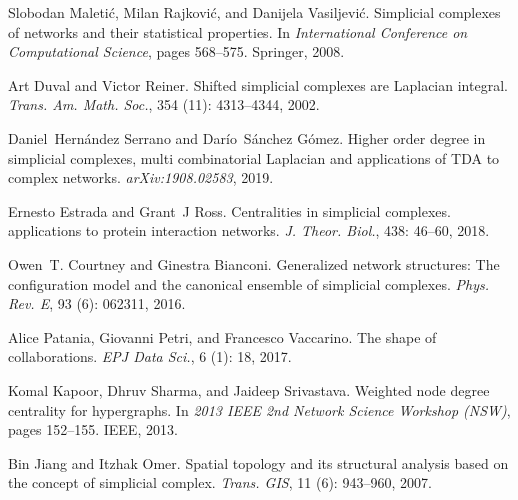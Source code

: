 Slobodan Maleti{\'c}, Milan Rajkovi{\'c}, and Danijela Vasiljevi{\'c}.
\newblock Simplicial complexes of networks and their statistical properties.
\newblock In \emph{International Conference on Computational Science}, pages
568--575. {Springer}, 2008.

Art Duval and Victor Reiner.
\newblock Shifted simplicial complexes are {{Laplacian}} integral.
\newblock \emph{Trans. Am. Math. Soc.}, 354 (11): 4313--4344,
2002.

Daniel~Hern{\'a}ndez Serrano and Dar{\'i}o~S{\'a}nchez G{\'o}mez.
\newblock Higher order degree in simplicial complexes, multi combinatorial
{{Laplacian}} and applications of {{TDA}} to complex networks.
\newblock \emph{arXiv:1908.02583}, 2019{}.

Ernesto Estrada and Grant~J Ross.
\newblock Centralities in simplicial complexes. applications to protein
interaction networks.
\newblock \emph{J. Theor. Biol.}, 438: 46--60, 2018.

Owen~T. Courtney and Ginestra Bianconi.
\newblock Generalized network structures: {{The}} configuration model and the
canonical ensemble of simplicial complexes.
\newblock \emph{Phys. Rev. E}, 93 (6): 062311, 2016.

Alice Patania, Giovanni Petri, and Francesco Vaccarino.
\newblock The shape of collaborations.
\newblock \emph{EPJ Data Sci.}, 6 (1): 18,
2017{}.

Komal Kapoor, Dhruv Sharma, and Jaideep Srivastava.
\newblock Weighted node degree centrality for hypergraphs.
\newblock In \emph{2013 {{IEEE}} 2nd Network Science Workshop ({{NSW}})}, pages
152--155. {IEEE}, 2013.

Bin Jiang and Itzhak Omer.
\newblock Spatial topology and its structural analysis based on the concept of
simplicial complex.
\newblock \emph{Trans. GIS}, 11 (6): 943--960, 2007.

